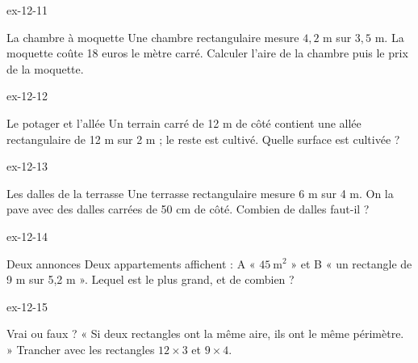 \begin{blocLivre}{ex-12-11}\begin{exercice}[3]{La chambre à moquette}
Une chambre rectangulaire mesure $4{,}2$ m sur $3{,}5$ m. La moquette coûte 18 euros le mètre carré. Calculer l’aire de la chambre puis le prix de la moquette.
\end{exercice}\end{blocLivre}
\begin{blocLivre}{ex-12-12}\begin{exercice}[3]{Le potager et l’allée}
Un terrain carré de 12 m de côté contient une allée rectangulaire de 12 m sur 2 m ; le reste est cultivé. Quelle surface est cultivée ?
\end{exercice}\end{blocLivre}
\begin{blocLivre}{ex-12-13}\begin{exercice}[3]{Les dalles de la terrasse}
Une terrasse rectangulaire mesure 6 m sur 4 m. On la pave avec des dalles carrées de 50 cm de côté. Combien de dalles faut-il ?
\end{exercice}\end{blocLivre}
\begin{blocLivre}{ex-12-14}\begin{exercice}[3]{Deux annonces}
Deux appartements affichent : A « $45\ \mathrm m^2$ » et B « un rectangle de 9 m sur 5,2 m ». Lequel est le plus grand, et de combien ?
\end{exercice}\end{blocLivre}
\begin{blocLivre}{ex-12-15}\begin{exercice}[3]{Vrai ou faux ?}
« Si deux rectangles ont la même aire, ils ont le même périmètre. » Trancher avec les rectangles $12\times3$ et $9\times4$.
\end{exercice}\end{blocLivre}

\clearpage
